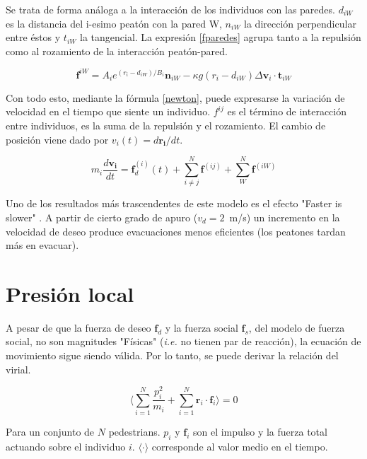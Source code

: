 Se trata de forma análoga a la interacción de los individuos con las paredes. $d_{iW}$ es la distancia del i-esimo peatón con la pared W, $n_{iW}$ la dirección perpendicular entre éstos y $t_{iW}$ la tangencial. La expresión \ref{fparedes} agrupa tanto a la repulsión como al rozamiento de la interacción peatón-pared.

\begin{equation}
\mathbf{f}^{iW}=A_ie^{(r_{i}-d_{iW})/B_i}\mathbf{n}_{iW}-\kappa g(r_{i}-d_{iW})\Delta \mathbf{v}_{i}\cdot\mathbf{t}_{iW}
\label{fparedes}
\end{equation} 

Con todo esto, mediante la fórmula \ref{newton}, puede expresarse la variación de velocidad en el tiempo que siente un individuo. $f^{ij}$ es el término de interacción entre individuos, es la suma de la repulsión y el rozamiento. El cambio de posición viene dado por $v_{i}(t)=d\mathbf{r_i}/dt$.

\begin{equation}
m_i\frac{d\mathbf{v_i}}{dt}=\mathbf{f}_d^ {(i)}(t)+ \sum_{i\neq j}^{N}\mathbf{f}^{(ij)} + \sum_{W}^{N}\mathbf{f}^{(iW)}
\label{newton}
\end{equation}  

Uno de los resultados más trascendentes de este modelo es el efecto "Faster is slower" \cite{Helbing1}. A partir de cierto grado de apuro ($v_d=2$~m/s) un incremento en la velocidad de deseo produce evacuaciones menos eficientes (los peatones tardan más en evacuar). 
 
\section{Presión local}

A pesar de que la fuerza de deseo $\mathbf{f}_d$ y la fuerza social $\mathbf{f}_s$, del modelo de fuerza social, no son magnitudes "Físicas" (\textit{i.e.} no tienen par de reacción), la ecuación de movimiento sigue siendo válida. Por lo tanto, se puede derivar la relación del virial\cite{lion}. 

\begin{equation}
 \bigg\langle\displaystyle\sum_{i=1}^N\displaystyle\frac{p_i^2}{m_i} + 
\displaystyle\sum_{i=1}^N 
\mathbf{r}_i\cdot\mathbf{f}_i\bigg\rangle=0\label{virial1}
\end{equation}


\noindent Para un conjunto de $N$ pedestrians. $p_i$  y $\mathbf{f}_i$ son el impulso y la fuerza total actuando sobre el individuo $i$. $\langle\cdot\rangle$ corresponde al valor medio en el tiempo.  \\


